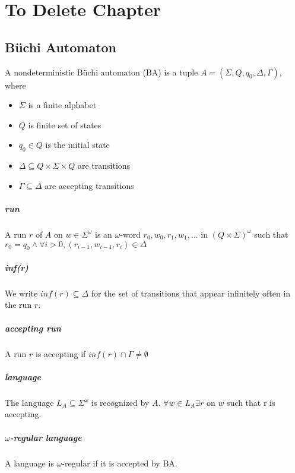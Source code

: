 \documentclass[
	digital
nolof, nolot
]{fithesis3}
\begin{document}
			
		
	\chapter{To Delete Chapter}
		\section{Büchi Automaton}
		A nondeterministic Büchi automaton (BA) is a tuple 
		$A=(\Sigma, Q, q_0, \Delta, \Gamma)$,
		where
		\begin{itemize}
			\item $\Sigma$ is a finite alphabet
			\item $Q$ is finite set of states
			\item $q_0 \in Q$ is the initial state
			\item $\Delta \subseteq Q \times \Sigma \times Q$
			are transitions
			\item $\Gamma \subseteq \Delta$
			are accepting transitions
		\end{itemize} 
		\paragraph{run}
		A run $r$ of $A$ on $w \in \Sigma^\omega$
		is an $\omega$-word $r_0, w_0, r_1, w_1,...$ in $(Q\times\Sigma)^\omega$
		such that $r_0 = q_0 \land\forall i>0, (r_{i-1}, w_{i-1}, r_i) \in \Delta$ 
		\paragraph{inf(r)}
		We write $inf(r) \subseteq \Delta$ for the set of transitions that appear infinitely often in the run $r$.
		\paragraph{accepting run} A run $r$ is accepting if $inf(r) \cap \Gamma \neq \emptyset$
		\paragraph{language}
		The language $L_A\subseteq\Sigma^\omega$ is recognized by $A$.\newline
		$\forall w \in L_A \exists r$ on $w$ such that r is accepting.
		\paragraph{$\omega$-regular language}
		A language is $\omega$-regular if it is accepted by BA.
\end{document}
